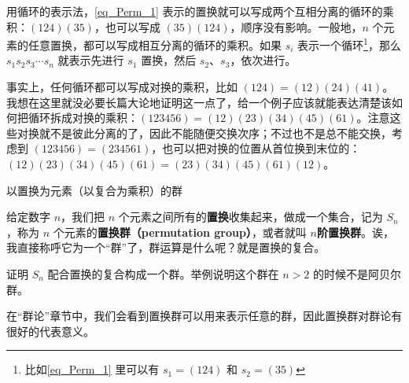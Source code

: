 用循环的表示法，\autoref{eq_Perm_1}  表示的置换就可以写成两个互相分离的循环的乘积：$(1 2 4)(3 5)$，也可以写成 $(3 5 )(1 2 4)$，顺序没有影响。一般地，$n$ 个元素的任意置换，都可以写成相互分离的循环的乘积。如果 $s_i$ 表示一个循环\footnote{比如\autoref{eq_Perm_1} 里可以有 $s_1=(1 2 4)$ 和 $s_2=(3 5)$}，那么 $s_1s_2s_3\cdots s_n$ 就表示先进行 $s_1$ 置换，然后 $s_2$、$s_3$，依次进行。

事实上，任何循环都可以写成对换的乘积，比如 $(1 2 4)=(1 2)(2 4)(4 1)$。我想在这里就没必要长篇大论地证明这一点了，给一个例子应该就能表达清楚该如何把循环拆成对换的乘积：$(1 2 3 4 5 6)=(1 2)(2 3)(3 4)(4 5)(6 1)$。注意这些对换就不是彼此分离的了，因此不能随便交换次序；不过也不是总不能交换，考虑到 $(1 2 3 4 5 6)=(2 3 4 5 6 1)$，也可以把对换的位置从首位换到末位的：$(1 2)(2 3)(3 4)(4 5)(6 1)=(2 3)(3 4)(4 5)(6 1)(1 2)$。

以置换为元素（以复合为乘积）的群

给定数字 $n$，我们把 $n$ 个元素之间所有的\textbf{置换}收集起来，做成一个集合，记为 $S_n$，称为 $n$ 个元素的\textbf{置换群（permutation group）}，或者就叫 $n$\textbf{阶置换群}。诶，我直接称呼它为一个“群”了，群运算是什么呢？就是置换的复合。

\begin{exercise}{}
证明 $S_n$ 配合置换的复合构成一个群。举例说明这个群在 $n>2$ 的时候不是阿贝尔群。
\end{exercise}

在“群论”章节中，我们会看到置换群可以用来表示任意的群，因此置换群对群论有很好的代表意义。





